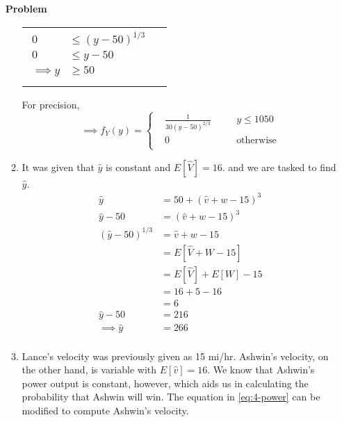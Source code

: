 \documentclass[12pt]{article}
\newenvironment{Ex}{\textbf{Problem}\vspace{.75em}\\}{}
\begin{document}
\begin{enumerate}
\begin{Ex}
\begin{solution}
\begin{enumerate}
\begin{table}[H]
\begin{tabularx}{\linewidth}{XX}
\begin{equation}
\begin{aligned}
                0 &\le (y-50)^{1/3} \\
                0 &\le y-50 \\
                \implies y &\ge 50 \\
              \end{aligned}
            \end{equation}
          \end{tabularx}
        \end{table}
        For precision,
        \begin{equation}
          \label{eq:4b-sol}
          \implies f_Y(y) = \left \{
            \begin{aligned}
              & \frac{1}{30 (y-50)^{2/3}} &&\quad y\le 1050 \\
              & 0 &&\quad\text{otherwise} \\
            \end{aligned} \right.
        \end{equation}
      \item It was given that $\hat{y}$ is constant and
        $E[\hat{V}]=16$. and we are tasked to find $\hat{y}$.
        \begin{equation}
          \label{eq:4c-sol}
          \begin{aligned}
            \hat{y} &= 50 + (\hat{v} + w - 15)^3 \\
            \hat{y} - 50 &= (\hat{v} + w - 15)^3 \\
            (\hat{y} - 50)^{1/3} &= \hat{v} + w - 15 \\
            &= E[\hat{V} + W - 15] \\
            &= E[\hat{V}] + E[W] - 15 \\
            &= 16+5-16 \\
            &= 6 \\
            \hat{y} - 50 &= 216 \\
            \implies \hat{y} &= 266 \\
          \end{aligned}
        \end{equation}
      \item
        Lance's velocity was previously given as 15 mi/hr. Ashwin's
        velocity, on the other hand, is variable with $E[\hat{v}] =
        16$. We know that Ashwin's power output is constant, however,
        which aids us in calculating the probability that Ashwin will
        win. The equation in \cref{eq:4-power} can be modified to
        compute Ashwin's velocity.

\end{enumerate}
\end{solution}
\end{Ex}
\end{enumerate}
\end{document}
